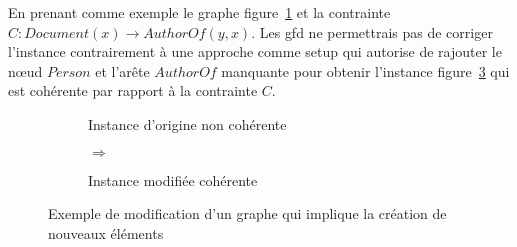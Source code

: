 \begin{example}
      En prenant comme exemple le graphe figure~\ref{fig:update:discussion:g1} et la contrainte $C: Document(x) \to AuthorOf(y, x)$.
      Les \gls{gfd} ne permettrais pas de corriger l'instance contrairement à une approche comme \gls{setup} qui autorise de rajouter le nœud $Person$ et l'arête $AuthorOf$ manquante pour obtenir l'instance figure~\ref{fig:update:discussion:g2} qui est cohérente par rapport à la contrainte $C$.

      \begin{figure}[htb]
            \centering
            \begin{subfigure}[c]{.35\textwidth}
                  \centering
                  \caption{Instance d'origine non cohérente}
                  \label{fig:update:discussion:g1}
            \end{subfigure}
            \hfill
            \begin{subfigure}[c]{.1\textwidth}
                \centering
                \huge{$\Longrightarrow$}
            \end{subfigure}
            \hfill
            \begin{subfigure}[c]{.45\textwidth}
                  \centering
                  \caption{Instance modifiée cohérente}
                  \label{fig:update:discussion:g2}
            \end{subfigure}
            \caption[Exemple de modification d'un graphe]{Exemple de modification d'un graphe qui implique la création de nouveaux éléments}
      \end{figure}
\end{example}

